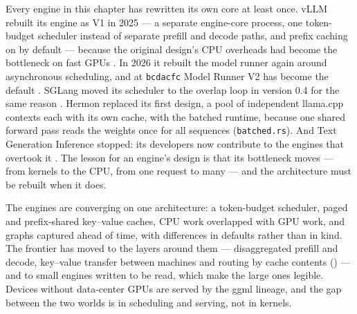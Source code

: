 


Every engine in this chapter has rewritten its own core at least once. vLLM
rebuilt its engine as V1 in 2025 --- a separate engine-core process, one
token-budget scheduler instead of separate prefill and decode paths, and prefix
caching on by default --- because the original design's CPU overheads had become
the bottleneck on fast GPUs \cite{vllm2025v1}. In 2026 it rebuilt the model
runner again around asynchronous scheduling, and at \texttt{bcdacfc} Model Runner
V2 has become the default \cite{vllm2026mrv2}. SGLang moved its scheduler to the
overlap loop in version 0.4 for the same reason \cite{sglang2024v04}. Hermon
replaced its first design, a pool of independent llama.cpp contexts each with
its own cache, with the batched runtime, because one shared forward pass reads
the weights once for all sequences (\texttt{batched.rs}). And Text Generation
Inference stopped: its developers now contribute to the engines that overtook it
\cite{huggingface2026tgi}. The lesson for an engine's design is that its
bottleneck moves --- from kernels to the CPU, from one request to many --- and the
architecture must be rebuilt when it does.


The engines are converging on one architecture: a token-budget scheduler,
paged and prefix-shared key--value caches, CPU work overlapped with GPU work,
and graphs captured ahead of time, with differences in defaults rather than in
kind. The frontier has moved to the layers around them --- disaggregated prefill
and decode, key--value transfer between machines and routing by cache contents
() --- and to small engines written to be read, which make the
large ones legible. Devices without data-center GPUs are served by the ggml
lineage, and the gap between the two worlds is in scheduling and serving, not in
kernels.

